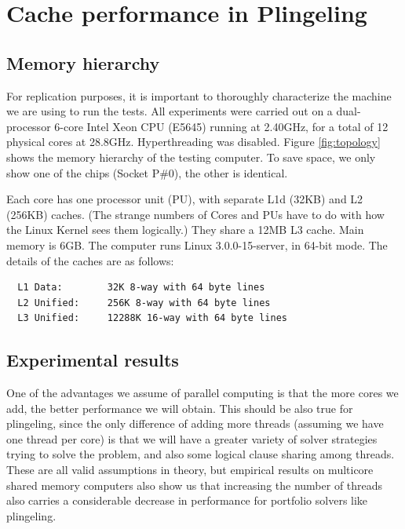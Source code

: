 \documentclass{llncs}
\begin{document}
\section{Cache performance in Plingeling}

\subsection{Memory hierarchy}
\label{sec:memhier}

For replication purposes, it is important to thoroughly characterize
the machine we are using to run the tests. All experiments were
carried out on a dual-processor 6-core Intel Xeon CPU (E5645) running
at 2.40GHz, for a total of 12 physical cores at
28.8GHz. Hyperthreading was disabled. Figure \ref{fig:topology} shows
the memory hierarchy of the testing computer. To save space, we only
show one of the chips (Socket P\#0), the other is identical.


Each core has one processor unit (PU), with separate L1d (32KB) and L2
(256KB) caches. (The strange numbers of Cores and PUs have to do with
how the Linux Kernel sees them logically.) They share a 12MB L3
cache. Main memory is 6GB. The computer runs Linux 3.0.0-15-server, in
64-bit mode. The details of the caches are as follows:

\small
\begin{verbatim}
  L1 Data:        32K 8-way with 64 byte lines
  L2 Unified:     256K 8-way with 64 byte lines
  L3 Unified:     12288K 16-way with 64 byte lines
\end{verbatim}
\normalsize

\subsection{Experimental results}

One of the advantages we assume of parallel computing is that the more
cores we add, the better performance we will obtain. This should be
also true for plingeling, since the only difference of adding more
threads (assuming we have one thread per core) is that we will have a
greater variety of solver strategies trying to solve the problem, and
also some logical clause sharing among threads. These are all valid
assumptions in theory, but empirical results on multicore shared
memory computers also show us that increasing the number of threads
also carries a considerable decrease in performance for portfolio
solvers like plingeling.
\end{document}
